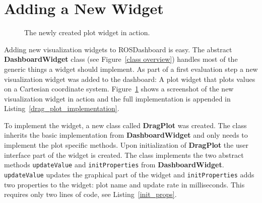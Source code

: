 \section{Adding a New Widget}
\begin{figure}[htb]
  \centering
  \caption{The newly created plot widget in action.}
  \label{plot_widget}
\end{figure}

Adding new visualization widgets to ROSDashboard is easy. The abstract \textbf{DashboardWidget} class (see Figure~\ref{class overview}) handles most of the generic things a widget should implement. As part of a first evaluation step a new visualization widget was added to the dashboard: A plot widget that plots values on a Cartesian coordinate system. Figure~\ref{plot_widget} shows a screenshot of the new visualization widget in action and the full implementation is appended in Listing~\ref{drag_plot_implementation}.

To implement the widget, a new class called \textbf{DragPlot} was created. The class inherits the basic implementation from \textbf{DashboardWidget} and only needs to implement the plot specific methods. Upon initialization of \textbf{DragPlot} the user interface part of the widget is created. The class implements the two abstract methods \verb+updateValue+ and \verb+initProperties+ from \textbf{DashboardWidget}. \verb+updateValue+ updates the graphical part of the widget and \verb+initProperties+ adds two properties to the widget: plot name and update rate in milliseconds. This requires only two lines of code, see Listing~\ref{init_props}.

